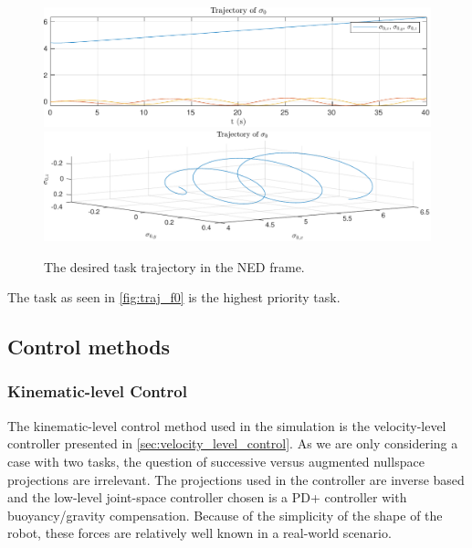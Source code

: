 \begin{figure}[h]
    \centering
    \includegraphics[width=\linewidth]{assets/plots/traj_xyz.pdf}
    \includegraphics[width=\linewidth]{assets/plots/traj_taskspace.pdf}
    \caption{The desired task trajectory in the NED frame.}
    \label{fig:traj_f0}
\end{figure}

The task as seen in \autoref{fig:traj_f0} is the highest priority task.


\subsection{Control methods}
\subsubsection{Kinematic-level Control}

The kinematic-level control method used in the simulation is the velocity-level
controller presented in \autoref{sec:velocity_level_control}. As we are only considering
a case with two tasks, the question of successive versus augmented nullspace projections
are irrelevant. The projections used in the controller are inverse based
and the low-level joint-space controller chosen is a PD+ controller
with buoyancy/gravity compensation. Because of the simplicity of the shape of the robot,
these forces are relatively well known in a real-world scenario.

